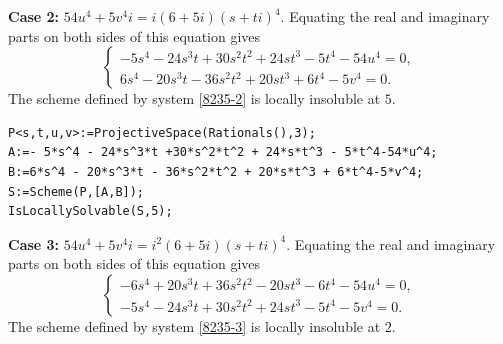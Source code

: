 \documentclass[a4paper,12pt,english,reqno]{amsart}
\begin{document}
{\bf Case 2:} $54u^4+5v^4i=i(6+5i)(s+ti)^4$. Equating the real and imaginary parts on both sides of this equation gives
\begin{equation}\label{8235-2}
\begin{cases}
-5s^4 - 24s^3t + 30s^2t^2 + 24st^3 - 5t^4 - 54u^4=0,\\
6s^4 - 20s^3t - 36s^2t^2 + 20st^3 + 6t^4 - 5v^4=0.
\end{cases}
\end{equation}
The scheme defined by system \eqref{8235-2} is locally insoluble at $5$.
%

\begin{lstlisting}
P<s,t,u,v>:=ProjectiveSpace(Rationals(),3);
A:=- 5*s^4 - 24*s^3*t +30*s^2*t^2 + 24*s*t^3 - 5*t^4-54*u^4;
B:=6*s^4 - 20*s^3*t - 36*s^2*t^2 + 20*s*t^3 + 6*t^4-5*v^4;
S:=Scheme(P,[A,B]);
IsLocallySolvable(S,5);
\end{lstlisting}

{\bf Case 3:} $54u^4+5v^4i=i^2(6+5i)(s+ti)^4$. Equating the real and imaginary parts on both sides of this equation gives
\begin{equation}\label{8235-3}
\begin{cases}
-6s^4 + 20s^3t + 36s^2t^2 - 20st^3 - 6t^4 - 54u^4=0,\\
-5s^4 - 24s^3t + 30s^2t^2 + 24st^3 - 5t^4 - 5v^4=0.
\end{cases}
\end{equation}
The scheme defined by system \eqref{8235-3} is locally insoluble at $2$.

\end{document}
